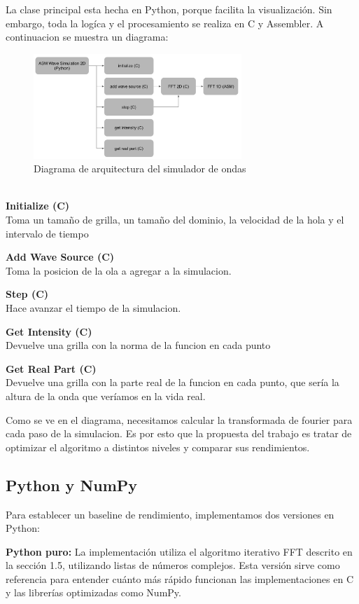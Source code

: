 \documentclass[a4paper]{article}
\begin{document}
La clase principal esta hecha en Python, porque facilita la visualización. Sin embargo, toda la logíca y el procesamiento se realiza
en C y Assembler. A continuacion se muestra un diagrama:
\begin{figure}[h]
    \centering
    \includegraphics[width=0.7\textwidth]{extra/diagram.png}
    \caption{Diagrama de arquitectura del simulador de ondas}
    \label{fig:wave_sim_architecture}
\end{figure} \\

\textbf{Initialize (C)} \\
Toma un tamaño de grilla, un tamaño del dominio, la velocidad de la hola y el intervalo de tiempo

\textbf{Add Wave Source (C)} \\
Toma la posicion de la ola a agregar a la simulacion.

\textbf{Step (C)} \\
Hace avanzar el tiempo de la simulacion.

\textbf{Get Intensity (C)} \\
Devuelve una grilla con la norma de la funcion en cada punto

\textbf{Get Real Part (C)} \\
Devuelve una grilla con la parte real de la funcion en cada punto, que sería la altura de la onda que veríamos en la vida real.

Como se ve en el diagrama, necesitamos calcular la transformada de fourier para cada paso de la simulacion. Es por esto que la
propuesta del trabajo es tratar de optimizar el algoritmo a distintos niveles y comparar sus rendimientos.

\subsection{Python y NumPy}

Para establecer un baseline de rendimiento, implementamos dos versiones en Python:

\textbf{Python puro:} La implementación utiliza el algoritmo iterativo FFT descrito en la sección 1.5, utilizando listas de números complejos. Esta versión sirve como referencia para entender cuánto más rápido funcionan las implementaciones en C y las librerías optimizadas como NumPy.
\end{document}
